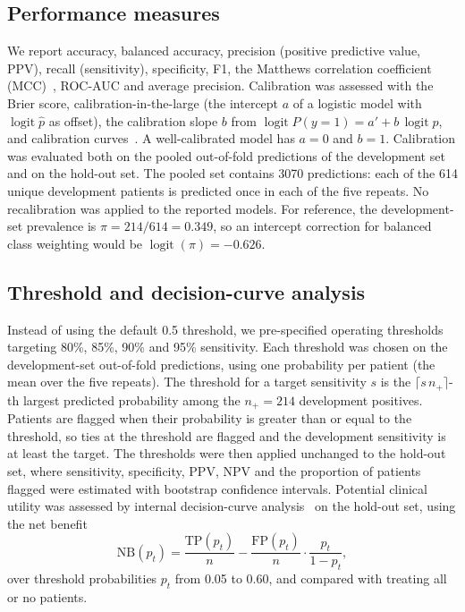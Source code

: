 \documentclass[preprint,12pt,authoryear=false]{elsarticle}
\begin{document}
\subsection{Performance measures}
We report accuracy, balanced accuracy, precision (positive predictive value, PPV), recall (sensitivity), specificity, F1, the Matthews correlation coefficient (MCC)~\cite{chicco2020mcc}, ROC-AUC and average precision. Calibration was assessed with the Brier score, calibration-in-the-large (the intercept $a$ of a logistic model with $\operatorname{logit}\hat p$ as offset), the calibration slope $b$ from $\operatorname{logit} P(y=1) = a' + b\,\operatorname{logit}\hat p$, and calibration curves~\cite{vancalster2019calibration}. A well-calibrated model has $a = 0$ and $b = 1$. Calibration was evaluated both on the pooled out-of-fold predictions of the development set and on the hold-out set. The pooled set contains 3070 predictions: each of the 614 unique development patients is predicted once in each of the five repeats. No recalibration was applied to the reported models. For reference, the development-set prevalence is $\pi = 214/614 = 0.349$, so an intercept correction for balanced class weighting would be $\operatorname{logit}(\pi) = -0.626$.

\subsection{Threshold and decision-curve analysis}
Instead of using the default 0.5 threshold, we pre-specified operating thresholds targeting 80\%, 85\%, 90\% and 95\% sensitivity. Each threshold was chosen on the development-set out-of-fold predictions, using one probability per patient (the mean over the five repeats). The threshold for a target sensitivity $s$ is the $\lceil s\,n_+\rceil$-th largest predicted probability among the $n_+ = 214$ development positives. Patients are flagged when their probability is greater than or equal to the threshold, so ties at the threshold are flagged and the development sensitivity is at least the target. The thresholds were then applied unchanged to the hold-out set, where sensitivity, specificity, PPV, NPV and the proportion of patients flagged were estimated with bootstrap confidence intervals. Potential clinical utility was assessed by internal decision-curve analysis~\cite{vickers2006dca} on the hold-out set, using the net benefit
\begin{equation}
  \mathrm{NB}(p_t) = \frac{\mathrm{TP}(p_t)}{n} - \frac{\mathrm{FP}(p_t)}{n}\cdot\frac{p_t}{1-p_t},
\end{equation}
over threshold probabilities $p_t$ from 0.05 to 0.60, and compared with treating all or no patients.
\end{document}
